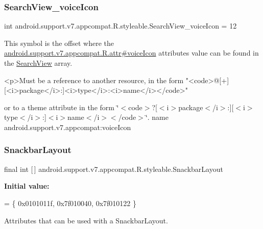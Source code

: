 \subsubsection{\texorpdfstring{Search\+View\+\_\+voice\+Icon}{SearchView\_voiceIcon}}
{\footnotesize\ttfamily int android.\+support.\+v7.\+appcompat.\+R.\+styleable.\+Search\+View\+\_\+voice\+Icon = 12\hspace{0.3cm}{\ttfamily [static]}}

This symbol is the offset where the \hyperlink{classandroid_1_1support_1_1v7_1_1appcompat_1_1R_1_1attr_ad6aa346699af6c2cc1b3a74ac7e59f41}{android.\+support.\+v7.\+appcompat.\+R.\+attr\#voice\+Icon} attribute\textquotesingle{}s value can be found in the \hyperlink{classandroid_1_1support_1_1v7_1_1appcompat_1_1R_1_1styleable_a01af09df9e38f1e4f57165c3d3cee9fe}{Search\+View} array.

\begin{DoxyVerb}      <p>Must be a reference to another resource, in the form "<code>@[+][<i>package</i>:]<i>type</i>:<i>name</i></code>"
\end{DoxyVerb}
 or to a theme attribute in the form \char`\"{}$<$code$>$?\mbox{[}$<$i$>$package$<$/i$>$\+:\mbox{]}\mbox{[}$<$i$>$type$<$/i$>$\+:\mbox{]}$<$i$>$name$<$/i$>$$<$/code$>$\char`\"{}.  name android.\+support.\+v7.\+appcompat\+:voice\+Icon \mbox{\label{classandroid_1_1support_1_1v7_1_1appcompat_1_1R_1_1styleable_a9887ec2f8bf8ba963b30b5160dcd1e61}} 
\subsubsection{\texorpdfstring{Snackbar\+Layout}{SnackbarLayout}}
{\footnotesize\ttfamily final int \mbox{[}$\,$\mbox{]} android.\+support.\+v7.\+appcompat.\+R.\+styleable.\+Snackbar\+Layout\hspace{0.3cm}{\ttfamily [static]}}

{\bfseries Initial value\+:}
\begin{DoxyCode}
= \{
            0x0101011f, 0x7f010040, 0x7f010122
        \}
\end{DoxyCode}
Attributes that can be used with a Snackbar\+Layout. 

